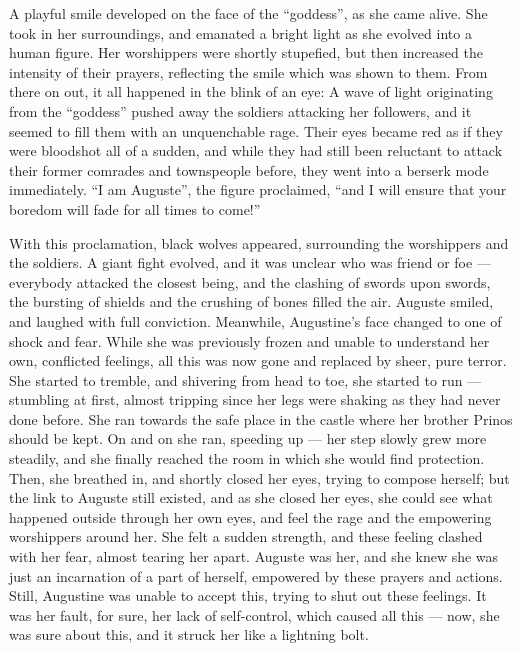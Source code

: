 A playful smile developed on the face of the \enquote{goddess}, as she came alive. She took in her surroundings, and emanated a bright light as she evolved into a human figure. Her worshippers were shortly stupefied, but then increased the intensity of their prayers, reflecting the smile which was shown to them. From there on out, it all happened in the blink of an eye: A wave of light originating from the \enquote{goddess} pushed away the soldiers attacking her followers, and it seemed to fill them with an unquenchable rage. Their eyes became red as if they were bloodshot all of a sudden, and while they had still been reluctant to attack their former comrades and townspeople before, they went into a berserk mode immediately. \enquote{I am Auguste}, the figure proclaimed, \enquote{and I will ensure that your boredom will fade for all times to come!}

With this proclamation, black wolves appeared, surrounding the worshippers and the soldiers. A giant fight evolved, and it was unclear who was friend or foe --- everybody attacked the closest being, and the clashing of swords upon swords, the bursting of shields and the crushing of bones filled the air. Auguste smiled, and laughed with full conviction. Meanwhile, Augustine's face changed to one of shock and fear. While she was previously frozen and unable to understand her own, conflicted feelings, all this was now gone and replaced by sheer, pure terror. She started to tremble, and shivering from head to toe, she started to run --- stumbling at first, almost tripping since her legs were shaking as they had never done before. She ran towards the safe place in the castle where her brother Prinos should be kept. On and on she ran, speeding up --- her step slowly grew more steadily, and she finally reached the room in which she would find protection. Then, she breathed in, and shortly closed her eyes, trying to compose herself; but the link to Auguste still existed, and as she closed her eyes, she could see what happened outside through her own eyes, and feel the rage and the empowering worshippers around her. She felt a sudden strength, and these feeling clashed with her fear, almost tearing her apart. Auguste was her, and she knew she was just an incarnation of a part of herself, empowered by these prayers and actions. Still, Augustine was unable to accept this, trying to shut out these feelings. It was her fault, for sure, her lack of self-control, which caused all this --- now, she was sure about this, and it struck her like a lightning bolt.

